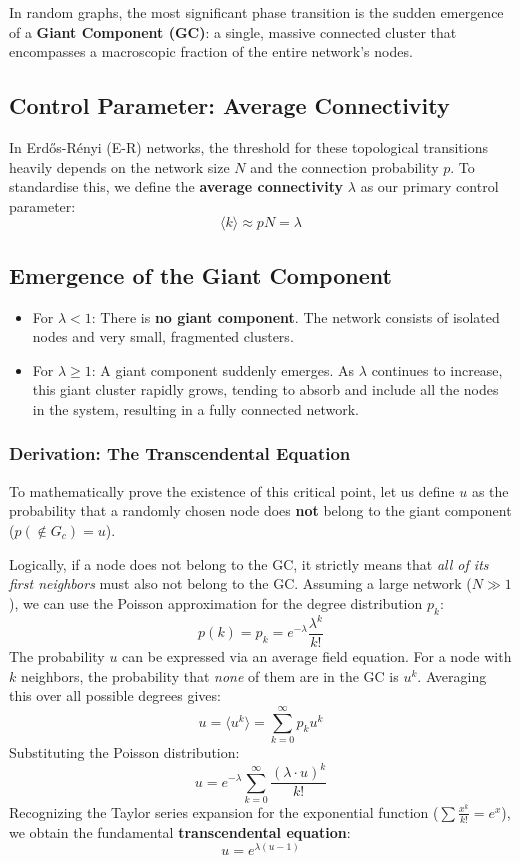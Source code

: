 In random graphs, the most significant phase transition is the sudden emergence of a \textbf{Giant Component (GC)}: a single, massive connected cluster that encompasses a macroscopic fraction of the entire network's nodes.

\subsection{Control Parameter: Average Connectivity}
In Erdős-Rényi (E-R) networks, the threshold for these topological transitions heavily depends on the network size \(N\) and the connection probability \(p\). To standardise this, we define the \textbf{average connectivity} \(\lambda\) as our primary control parameter:
\[
    \langle k \rangle \approx pN = \lambda
\]

\subsection{Emergence of the Giant Component}

\begin{definition}
    \begin{itemize}
        \item For \(\lambda < 1\): There is \textbf{no giant component}. The network consists of isolated nodes and very small, fragmented clusters.
        \item For \(\lambda \geq 1\): A giant component suddenly emerges. As \(\lambda\) continues to increase, this giant cluster rapidly grows, tending to absorb and include all the nodes in the system, resulting in a fully connected network.
    \end{itemize}
\end{definition}

\subsubsection{Derivation: The Transcendental Equation}
To mathematically prove the existence of this critical point, let us define \(u\) as the probability that a randomly chosen node does \textbf{not} belong to the giant component (\(p(\notin G_c) = u\)).

Logically, if a node does not belong to the GC, it strictly means that \textit{all of its first neighbors} must also not belong to the GC. Assuming a large network (\(N \gg 1\)), we can use the Poisson approximation for the degree distribution \(p_k\):
\[
    p(k) = p_k = e^{-\lambda} \frac{\lambda^k}{k!}
\]
The probability \(u\) can be expressed via an average field equation. For a node with \(k\) neighbors, the probability that \textit{none} of them are in the GC is \(u^k\). Averaging this over all possible degrees gives:
\[
    u = \langle u^k \rangle = \sum_{k=0}^{\infty} p_k u^k
\]
Substituting the Poisson distribution:
\[
    u = e^{-\lambda} \sum_{k=0}^{\infty} \frac{(\lambda \cdot u)^k}{k!}
\]
Recognizing the Taylor series expansion for the exponential function (\(\sum \frac{x^k}{k!} = e^x\)), we obtain the fundamental \textbf{transcendental equation}:
\[
    u = e^{\lambda(u-1)}
\]

